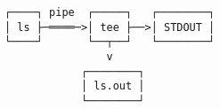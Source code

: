 \documentclass[varwidth,crop]{standalone}
\begin{document}
\begin{verbatim}
┌────┐ pipe  ┌─────┐   ┌────────┐
│ ls ├─════─>│ tee ├──>│ STDOUT │
└────┘       └──┬──┘   └────────┘
                v
            ┌────────┐
            │ ls.out │
            └────────┘
\end{verbatim}
\end{document}
